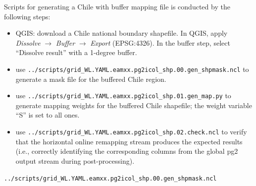 \documentclass[journal abbreviation, manuscript]{copernicus}
\begin{document}
Scripts for generating a Chile with buffer mapping file is conducted by the following steps:
\begin{itemize}
  \item QGIS: download a Chile national boundary shapefile. In QGIS, apply \emph{Dissolve} $\rightarrow$ \emph{Buffer} $\rightarrow$ \emph{Export} (EPSG:4326). In the buffer step, select ``Dissolve result'' with a 1-degree buffer.

  \item use \lstinline|../scripts/grid_WL.YAML.eamxx.pg2icol_shp.00.gen_shpmask.ncl| to generate a mask file for the buffered Chile region.

  \item use \lstinline|../scripts/grid_WL.YAML.eamxx.pg2icol_shp.01.gen_map.py| to generate mapping weights for the buffered Chile shapefile; the weight variable ``S'' is set to all ones.

  \item use \lstinline|../scripts/grid_WL.YAML.eamxx.pg2icol_shp.02.check.ncl| to verify that the horizontal online remapping stream produces the expected results (i.e., correctly identifying the corresponding columns from the global pg2 output stream during post-processing).
\end{itemize}
\vspace{\baselineskip}


\lstinline|../scripts/grid_WL.YAML.eamxx.pg2icol_shp.00.gen_shpmask.ncl|
\end{document}
